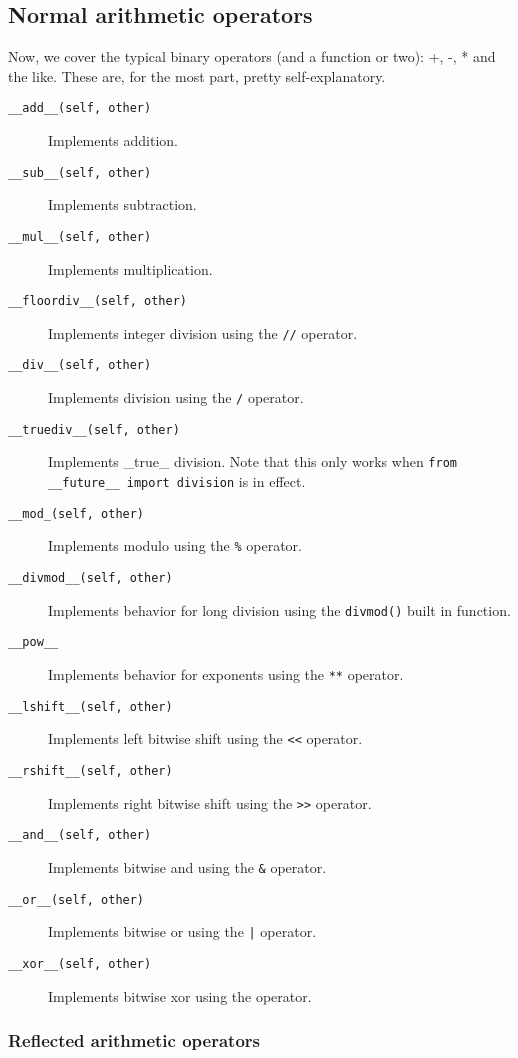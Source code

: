 \documentclass[a4paper,11pt]{article}
\newcommand{\code}[1]{\texttt{#1}}
\begin{document}
\subsection{Normal arithmetic operators}

Now, we cover the typical binary operators (and a function or two): +, -, * and the like. These are, for the most part, pretty self-explanatory.

\begin{description}

\item[\code{__add__(self, other)}]
Implements addition.
\item[\code{__sub__(self, other)}]
Implements subtraction.
\item[\code{__mul__(self, other)}]
Implements multiplication.
\item[\code{__floordiv__(self, other)}]
Implements integer division using the \code{//} operator.
\item[\code{__div__(self, other)}]
Implements division using the \code{/} operator.
\item[\code{__truediv__(self, other)}]
Implements _true_ division. Note that this only works when \code{from __future__ import division} is in effect.
\item[\code{__mod_(self, other)}]
Implements modulo using the \code{\%} operator.
\item[\code{__divmod__(self, other)}]
Implements behavior for long division using the \code{divmod()} built in function.
\item[\code{__pow__}]
Implements behavior for exponents using the \code{**} operator.
\item[\code{__lshift__(self, other)}]
Implements left bitwise shift using the \code{<<} operator.
\item[\code{__rshift__(self, other)}]
Implements right bitwise shift using the \code{>>} operator.
\item[\code{__and__(self, other)}]
Implements bitwise and using the \code{\&} operator.
\item[\code{__or__(self, other)}]
Implements bitwise or using the \code{|} operator.
\item[\code{__xor__(self, other)}]
Implements bitwise xor using the \code{} operator.

\end{description}

\subsubsection{Reflected arithmetic operators}
\end{document}
